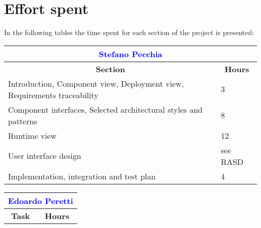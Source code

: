 \chapter{Effort spent}\label{c:effort}
In the following tables the time spent for each section of the project is presented:

\renewcommand\arraystretch{1.5}
\begin{table}[ht]
\centering
\begin{tabular}{|l|l|}
\multicolumn{2}{c}{\textcolor{Blue}{\textbf{Stefano Pecchia}}} \\\hline
\multicolumn{1}{|c|}{\textbf{Section}} & \multicolumn{1}{|c|}{\textbf{Hours}} \\\hline
   Introduction, Component view, Deployment view, Requirements traceability & 3 
    \\ \hline
    Component interfaces, Selected architectural styles and patterns & 8
    \\ \hline
    Runtime view & 12
    \\ \hline 
    User interface design & see RASD
      \\ \hline 
    Implementation, integration and test plan & 4
	\\ \hline
	\end{tabular} \hspace{2.5em}
	\begin{tabular}{|l|l|}
\multicolumn{2}{c}{\textcolor{Blue}{\textbf{Edoardo Peretti}}} \\\hline
\multicolumn{1}{|c|}{\textbf{Task}} & \multicolumn{1}{|c|}{\textbf{Hours}} \\\hline

\end{tabular}
\end{table}